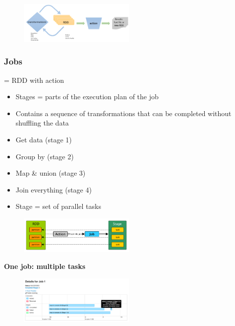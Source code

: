 \documentclass{article}
\begin{document}
\begin{figure}[H]
    \centering
    \includegraphics[width=0.5\textwidth]{rdd-schematic.png}
    \caption{}
\end{figure}

\subsubsection{Jobs}

= RDD with action

\begin{itemize}
    \item Stages = parts of the execution plan of the job
    \item Contains a sequence of transformations that can be completed without shuffling the data
    \item Get data (stage 1)
    \item Group by (stage 2)
    \item Map \& union (stage 3)
    \item Join everything (stage 4)
    \item Stage = set of parallel tasks
\end{itemize}

\begin{figure}[H]
    \centering
    \includegraphics[width=0.5\textwidth]{spark-jobs.png}
\end{figure}

\textbf{One job: multiple tasks}

\begin{figure}[H]
    \centering
    \includegraphics[width=0.5\textwidth]{spark-jobs2.png}
    \caption{}
\end{figure}
\end{document}
